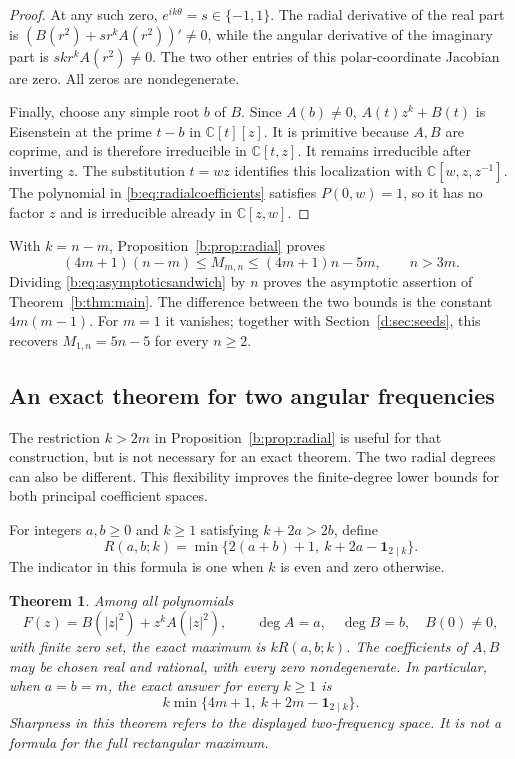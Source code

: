 \documentclass[UTF8,11pt]{ctexart}
\newtheorem{thm}{Theorem}[section]
\theoremstyle{definition}
\numberwithin{equation}{section}
\newcommand{\C}{\mathbb C}\newcommand{\R}{\mathbb R}
\begin{document}
\begin{proof}
At any such zero, $e^{ik\theta}=s\in\{-1,1\}$.
The radial derivative of the real part is
$(B(r^2)+s r^kA(r^2))'\ne0$, while the angular derivative of the
imaginary part is $sk r^kA(r^2)\ne0$. The two other entries of
this polar-coordinate Jacobian are zero. All zeros are nondegenerate.

Finally, choose any simple root $b$ of $B$. Since $A(b)\ne0$,
$A(t)z^k+B(t)$ is Eisenstein at the prime $t-b$ in $\C[t][z]$.
It is primitive because $A,B$ are coprime, and is therefore
irreducible in $\C[t,z]$. It remains irreducible after inverting $z$.
The substitution $t=wz$ identifies this localization with
$\C[w,z,z^{-1}]$. The polynomial in \eqref{b:eq:radialcoefficients}
satisfies $P(0,w)=1$, so it has no factor $z$ and is irreducible
already in $\C[z,w]$.
\end{proof}

With $k=n-m$, Proposition~\ref{b:prop:radial} proves
\begin{equation}\label{b:eq:asymptoticsandwich}
 (4m+1)(n-m)\le M_{m,n}\le(4m+1)n-5m,
 \qquad n>3m.
\end{equation}
Dividing \eqref{b:eq:asymptoticsandwich} by $n$ proves
the asymptotic assertion of Theorem~\ref{b:thm:main}.
The difference between the two bounds is the constant $4m(m-1)$.
For $m=1$ it vanishes; together with Section~\ref{d:sec:seeds}, this recovers
$M_{1,n}=5n-5$ for every $n\ge2$.

\subsection{An exact theorem for two angular frequencies}\label{new:sec:twofreq}

The restriction $k>2m$ in Proposition~\ref{b:prop:radial} is useful for
that construction, but is not necessary for an exact theorem. The two
radial degrees can also be different. This flexibility improves the
finite-degree lower bounds for both principal coefficient spaces.

For integers $a,b\ge0$ and $k\ge1$ satisfying $k+2a>2b$, define
\begin{equation}\label{new:eq:R}
 R(a,b;k)=\min\{2(a+b)+1,\ k+2a-\mathbf1_{2\mid k}\}.
\end{equation}
The indicator in this formula is one when $k$ is even and zero otherwise.

\begin{thm}\label{new:thm:radial}
Among all polynomials
\[
 F(z)=B(|z|^2)+z^k A(|z|^2),\qquad
 \deg A=a,\quad \deg B=b,\quad B(0)\ne0,
\]
with finite zero set, the exact maximum is $kR(a,b;k)$.
The coefficients of $A,B$ may be chosen real and rational, with every
zero nondegenerate. In particular, when $a=b=m$, the exact answer for
every $k\ge1$ is
\begin{equation}\label{new:eq:balanced}
 k\min\{4m+1,\ k+2m-\mathbf1_{2\mid k}\}.
\end{equation}
Sharpness in this theorem refers to the displayed two-frequency space.
It is not a formula for the full rectangular maximum.
\end{thm}
\end{document}

